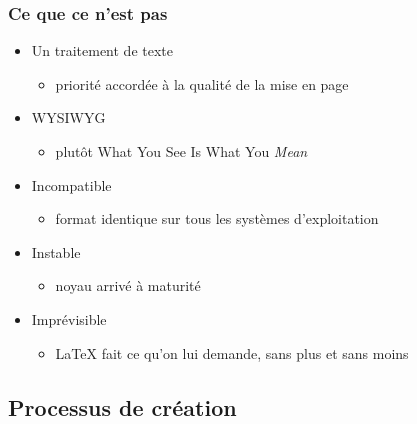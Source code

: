 \documentclass[aspectratio=54,10pt,xcolor=x11names]{beamer}
\theoremstyle{example}
\begin{document}
\begin{frame}
  \frametitle{Ce que ce n'est pas}
  \begin{itemize}
  \item Un traitement de texte
    \begin{itemize}
    \item priorité accordée à la qualité de la mise en page
    \end{itemize}
  \item WYSIWYG
    \begin{itemize}
    \item plutôt What You See Is What You \emph{Mean}
    \end{itemize}
  \item Incompatible
    \begin{itemize}
    \item format identique sur tous les systèmes d'exploitation
    \end{itemize}
  \item Instable
    \begin{itemize}
    \item noyau arrivé à maturité
    \end{itemize}
  \item Imprévisible
    \begin{itemize}
    \item {\LaTeX} fait ce qu'on lui demande, sans plus et sans moins
    \end{itemize}
  \end{itemize}
\end{frame}

\subsection{Processus de création}
\end{document}
